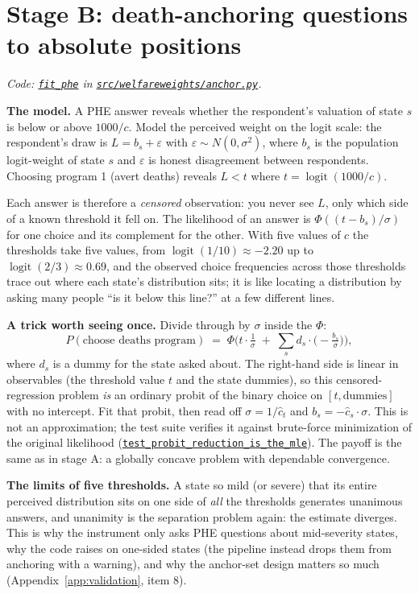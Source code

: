 \documentclass[11pt]{article}
\newcommand{\repo}{https://github.com/welfareweights/engine}
\newcommand{\src}[1]{\href{\repo/blob/main/#1}{\texttt{#1}}}
\newcommand{\fn}[1]{\href{https://github.com/search?q=repo\%3Awelfareweights\%2Fengine+symbol\%3A#1\&type=code}{\texttt{#1}}}
\newcommand{\logit}{\operatorname{logit}}
\begin{document}
\section{Stage B: death-anchoring questions to absolute positions}

\emph{Code: \fn{fit\_phe} in \src{src/welfareweights/anchor.py}.}

\textbf{The model.} A PHE answer reveals whether the respondent's valuation of state $s$ is below or above $1000/c$. Model the perceived weight on the logit scale: the respondent's draw is $L = b_s + \varepsilon$ with $\varepsilon \sim N(0,\sigma^2)$, where $b_s$ is the population logit-weight of state $s$ and $\varepsilon$ is honest disagreement between respondents. Choosing program 1 (avert deaths) reveals $L < t$ where $t = \logit(1000/c)$.

Each answer is therefore a \emph{censored} observation: you never see $L$, only which side of a known threshold it fell on. The likelihood of an answer is $\Phi((t-b_s)/\sigma)$ for one choice and its complement for the other. With five values of $c$ the thresholds take five values, from $\logit(1/10) \approx -2.20$ up to $\logit(2/3) \approx 0.69$, and the observed choice frequencies across those thresholds trace out where each state's distribution sits; it is like locating a distribution by asking many people ``is it below this line?'' at a few different lines.

\textbf{A trick worth seeing once.} Divide through by $\sigma$ inside the $\Phi$:
\begin{equation}
P(\text{choose deaths program}) \;=\; \Phi\!\Big(t\cdot\tfrac{1}{\sigma} \;+\; \textstyle\sum_s d_s \cdot \big(-\tfrac{b_s}{\sigma}\big)\Big),
\end{equation}
where $d_s$ is a dummy for the state asked about. The right-hand side is linear in observables (the threshold value $t$ and the state dummies), so this censored-regression problem \emph{is} an ordinary probit of the binary choice on $[t, \text{dummies}]$ with no intercept. Fit that probit, then read off $\sigma = 1/\hat{c}_t$ and $b_s = -\hat{c}_s \cdot \sigma$. This is not an approximation; the test suite verifies it against brute-force minimization of the original likelihood (\fn{test\_probit\_reduction\_is\_the\_mle}). The payoff is the same as in stage A: a globally concave problem with dependable convergence.

\textbf{The limits of five thresholds.} A state so mild (or severe) that its entire perceived distribution sits on one side of \emph{all} the thresholds generates unanimous answers, and unanimity is the separation problem again: the estimate diverges. This is why the instrument only asks PHE questions about mid-severity states, why the code raises on one-sided states (the pipeline instead drops them from anchoring with a warning), and why the anchor-set design matters so much (Appendix~\ref{app:validation}, item 8).
\end{document}
